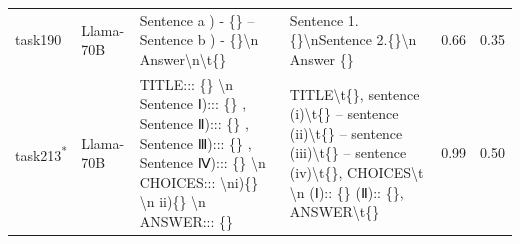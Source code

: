 \begin{longtable}{@{}p{0.8cm\tiny}p{1cm\tiny}p{4.1cm\ttfamily\tiny}p{4.1cm\ttfamily\tiny}p{0.8cm\tiny}p{0.8cm\tiny}@{}}
task190   & Llama-70B  & Sentence a ) - \{\} -- Sentence b ) - \{\}\textbackslash{}n Answer\textbackslash{}n\textbackslash{}t\{\}                                                                                                                                                                                                                                                                                                                                                                                                                & Sentence  1.\{\}\textbackslash{}nSentence  2.\{\}\textbackslash{}n Answer \{\}                                                                                                                                                                                                                                                                                                                                                                                                                                                                                                    & 0.66 & 0.35 \\
task213\textsuperscript{*}   & Llama-70B  & TITLE::: \{\} \textbackslash{}n Sentence  Ⅰ)::: \{\} , Sentence  Ⅱ)::: \{\} , Sentence  Ⅲ)::: \{\} , Sentence  Ⅳ)::: \{\} \textbackslash{}n CHOICES::: \textbackslash{}ni)\{\} \textbackslash{}n ii)\{\} \textbackslash{}n ANSWER::: \{\}                                                                                                                                                                                                                                                                               & TITLE\textbackslash{}t\{\}, sentence  (i)\textbackslash{}t\{\} -- sentence  (ii)\textbackslash{}t\{\} -- sentence  (iii)\textbackslash{}t\{\} -- sentence  (iv)\textbackslash{}t\{\}, CHOICES\textbackslash{}t \textbackslash{}n (Ⅰ):: \{\} (Ⅱ):: \{\}, ANSWER\textbackslash{}t\{\}                                                                                                                                                                                                                                                                                               & 0.99 & 0.50 \\

\end{longtable}
